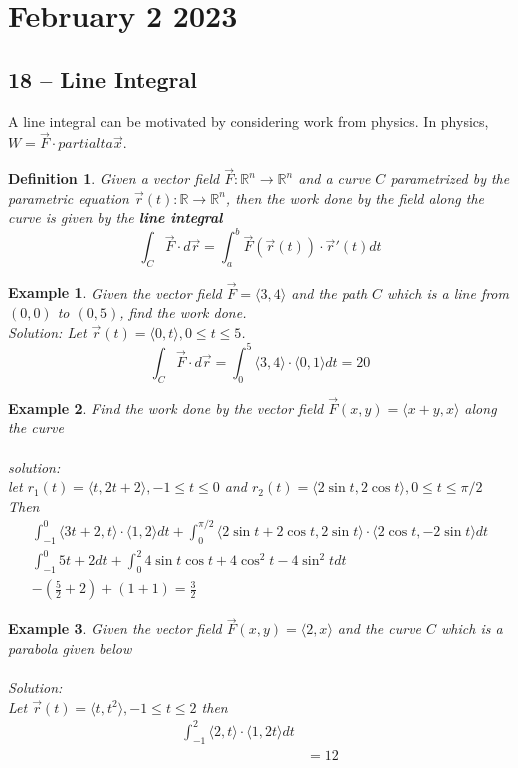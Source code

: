 \documentclass[11pt]{article}
\newtheorem{defn}{Definition}
\newtheorem{ex}{Example}
\begin{document}
\section{February 2 2023}
\subsection{18 -- Line Integral}
A line integral can be motivated by considering work from physics. In physics, $W = \vec{F} \cdot partialta\vec{ x}$.
\begin{defn}
  Given a vector field $\vec{F} : \mathbb{R}^{n} \to \mathbb{R}^{n}$ and a curve $C$ parametrized by the parametric equation
  $\vec{r}(t) : \mathbb{R} \to \mathbb{R}^{n}$, then the work done by the field along the curve is given by the \textbf{line integral}
  \[\int_{C} \vec{F} \cdot d\vec{r} = \int_{a}^{b} \vec{F}(\vec{r}(t)) \cdot \vec{r} '(t) dt\]
\end{defn}
\begin{ex}
  Given the vector field $\vec{F} = \langle 3, 4 \rangle$ and the path $C$ which is a line from
  $(0, 0)$ to $(0, 5)$, find the work done. \\
  Solution:
  Let $\vec{r}(t) = \langle 0, t \rangle, 0 \le t \le 5$.
  \[\int_{C} \vec{F} \cdot d\vec{r} = \int_{0}^{5} \langle 3, 4\rangle \cdot \langle 0, 1 \rangle dt
   = 20\]
\end{ex}
\begin{ex}
  Find the work done by the vector field $\vec{F}(x,y) = \langle x+ y, x \rangle$
  along the curve\\
  \\
  solution: \\
  let $r_{1}(t) = \langle t,  2t + 2 \rangle, -1 \le t \le 0$
  and $r_{2}(t) = \langle 2\sin t, 2\cos t \rangle, 0 \le t \le \pi/2 $
  Then
\begin{align*}
  \int_{-1}^{0} \langle 3t + 2, t \rangle \cdot \langle 1, 2 \rangle dt
  + \int_{0}^{\pi/2} \langle 2 \sin t + 2 \cos t, 2 \sin t \rangle \cdot \langle 2 \cos t, -2 \sin t \rangle dt\\
  \int_{-1}^{0} 5t + 2 dt + \int_{0}^{2} 4 \sin t \cos t + 4 \cos^{2} t - 4 \sin^{2} t dt \\
  -(\frac{5}{2} + 2) + (1 + 1 ) = \frac{3}{2}
\end{align*}

\end{ex}
\begin{ex}
  Given the vector field $\vec{F}(x,y) = \langle 2 , x \rangle$ and the curve $C$ which is a parabola given below\\
  \\
  Solution: \\
  Let $\vec{r}(t) = \langle t, t^{2} \rangle, -1 \le t \le 2$
  then
  \begin{align*}
    \int_{-1}^{2} \langle 2, t \rangle \cdot \langle 1, 2t \rangle dt \\
    &= 12
  \end{align*}
\end{ex}
\end{document}
